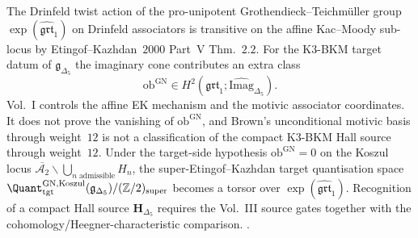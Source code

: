 \begin{remark}
\label{rem:nc-grt1-bkm-transitivity-vol1}
The Drinfeld twist action of the pro-unipotent
Grothendieck--Teichm\"uller group
$\exp(\widehat{\mathfrak{grt}}_1)$ on Drinfeld associators is
transitive on the affine Kac--Moody sub-locus by
Etingof--Kazhdan~$2000$ Part~V Thm.~$2.2$. For the K$3$-BKM target
datum of $\mathfrak g_{\Delta_5}$ the imaginary cone contributes an
extra class
\[
\mathrm{ob}^{\mathrm{GN}} \in
H^2(\mathfrak{grt}_1;\widehat{\mathrm{Imag}}_{\Delta_5}) .
\]
Vol.~I controls the affine EK mechanism and the motivic associator
coordinates. It does not prove the vanishing of
$\mathrm{ob}^{\mathrm{GN}}$, and Brown's unconditional motivic basis
through weight~$12$ is not a classification of the compact K$3$-BKM
Hall source through weight~$12$. Under the target-side hypothesis
$\mathrm{ob}^{\mathrm{GN}}=0$ on the Koszul locus
$\overline{\mathcal A_2}\smallsetminus\bigcup_{n\;\text{admissible}}H_n$,
the super-Etingof--Kazhdan target quantisation space
$\Quant^{\mathrm{GN, Koszul}}_{\mathrm{tgt}}(\mathfrak g_{\Delta_5})/
(\mathbb Z/2)_{\mathrm{super}}$ becomes a torsor over
$\exp(\widehat{\mathfrak{grt}}_1)$. Recognition of a compact Hall
source $\mathbf H_{\Delta_5}$ requires the Vol.~III source gates
together with the cohomology/Heegner-characteristic comparison.
\cite{Drinfeld1990,Brown2012,Willwacher2015,SchnepperWillwacher2017,
 GritsenkoNikulin1998,Borcherds1995}.
\end{remark}

